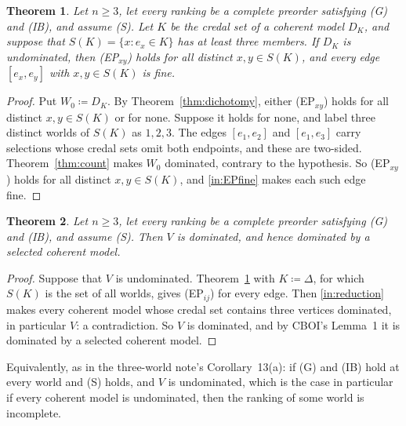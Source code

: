 \documentclass[11pt]{article}
\newtheorem{theorem}{Theorem}
\theoremstyle{definition}\newtheorem{definition}[theorem]{Definition}
\theoremstyle{remark}\newtheorem{remark}[theorem]{Remark}
\begin{document}
\begin{theorem}\label{thm:clique}
Let $n\ge3$, let every ranking be a complete preorder satisfying (G) and
(IB), and assume (S). Let $K$ be the credal set of a coherent model $D_K$,
and suppose that $S(K)=\{x:e_x\in K\}$ has at least three members. If
$D_K$ is undominated, then (EP$_{xy}$) holds for all distinct $x,y\in
S(K)$, and every edge $[e_x,e_y]$ with $x,y\in S(K)$ is fine.
\end{theorem}
\begin{proof}
Put $W_0\coloneqq D_K$. By Theorem~\ref{thm:dichotomy}, either (EP$_{xy}$)
holds for all distinct $x,y\in S(K)$ or for none. Suppose it holds for
none, and label three distinct worlds of $S(K)$ as $1,2,3$. The edges
$[e_1,e_2]$ and $[e_1,e_3]$ carry selections whose credal sets omit both
endpoints, and these are two-sided. Theorem~\ref{thm:count} makes $W_0$
dominated, contrary to the hypothesis. So (EP$_{xy}$) holds for all
distinct $x,y\in S(K)$, and \ref{in:EPfine} makes each such edge fine.
\end{proof}

\begin{theorem}\label{thm:main}
Let $n\ge3$, let every ranking be a complete preorder satisfying (G) and
(IB), and assume (S). Then $V$ is dominated, and hence dominated by a
selected coherent model.
\end{theorem}
\begin{proof}
Suppose that $V$ is undominated. Theorem~\ref{thm:clique} with
$K\coloneqq\Delta$, for which $S(K)$ is the set of all worlds, gives
(EP$_{ij}$) for every edge. Then \ref{in:reduction} makes every coherent
model whose credal set contains three vertices dominated, in particular
$V$: a contradiction. So $V$ is dominated, and by CBOI's Lemma~1 it is
dominated by a selected coherent model.
\end{proof}

Equivalently, as in the three-world note's Corollary~13(a): if (G) and (IB)
hold at every world and (S) holds, and $V$ is undominated, which is the
case in particular if every coherent model is undominated, then the
ranking of some world is incomplete.
\end{document}

